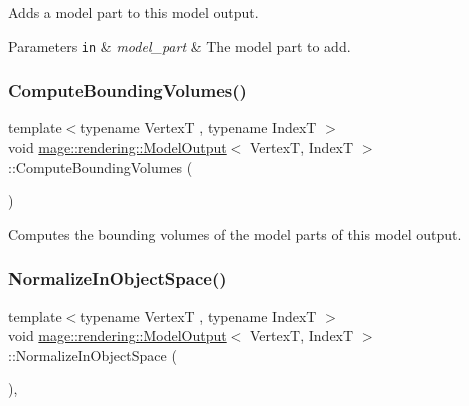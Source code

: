 Adds a model part to this model output.


\begin{DoxyParams}[1]{Parameters}
\mbox{\tt in}  & {\em model\+\_\+part} & The model part to add. \\
\hline
\end{DoxyParams}
\mbox{\label{structmage_1_1rendering_1_1_model_output_ad4b90961094b967a33fedd7e65a3f77a}} 
\subsubsection{\texorpdfstring{Compute\+Bounding\+Volumes()}{ComputeBoundingVolumes()}}
{\footnotesize\ttfamily template$<$typename VertexT , typename IndexT $>$ \\
void \mbox{\hyperlink{structmage_1_1rendering_1_1_model_output}{mage\+::rendering\+::\+Model\+Output}}$<$ VertexT, IndexT $>$\+::Compute\+Bounding\+Volumes (\begin{DoxyParamCaption}{ }\end{DoxyParamCaption})\hspace{0.3cm}{\ttfamily [noexcept]}}

Computes the bounding volumes of the model parts of this model output. \mbox{\label{structmage_1_1rendering_1_1_model_output_af5a1604a451f2e5b993ed94b871b1e85}} 
\subsubsection{\texorpdfstring{Normalize\+In\+Object\+Space()}{NormalizeInObjectSpace()}}
{\footnotesize\ttfamily template$<$typename VertexT , typename IndexT $>$ \\
void \mbox{\hyperlink{structmage_1_1rendering_1_1_model_output}{mage\+::rendering\+::\+Model\+Output}}$<$ VertexT, IndexT $>$\+::Normalize\+In\+Object\+Space (\begin{DoxyParamCaption}{ }\end{DoxyParamCaption})\hspace{0.3cm}{\ttfamily [private]}, {\ttfamily [noexcept]}}

